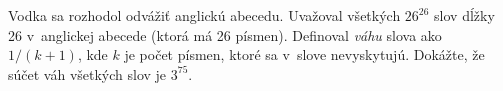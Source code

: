 \createTaskHeader
Vodka sa rozhodol odvážiť anglickú abecedu. Uvažoval všetkých $26^{26}$ slov dĺžky 26 v~anglickej abecede (ktorá má 26 písmen).
Definoval \emph{váhu} slova ako $1/(k+1)$, kde $k$ je počet písmen, ktoré sa v~slove nevyskytujú.
Dokážte, že súčet váh všetkých slov je $3^{75}$.
